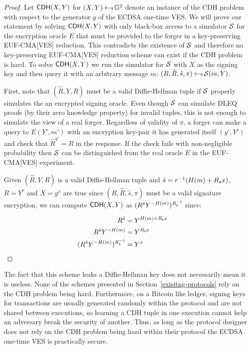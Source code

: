 \documentclass[fullpage]{article}
\theoremstyle{definition}
\newcommand{\EUFCMAVES}{\textsf{EUF-CMA}[\textsf{VES}]\xspace}
\newcommand{\G}{\mathbb{G}}
\begin{document}
\begin{proof}

  Let $\textsf{CDH}(X,Y)$ for $(X,Y) \sample \G^2$ denote an instance of the CDH problem with respect to the generator $g$ of the ECDSA one-time VES\@. We will prove our statement by solving $\textsf{CDH}(X,Y)$ with only black-box access to a simulator $\mathcal{S}$ for the encryption oracle $E$ that must be provided to the forger in a key-preserving \EUFCMAVES reduction. This contradicts the existence of $\mathcal{S}$ and therefore no key-preserving \EUFCMAVES reduction scheme can exist if the CDH problem is hard. To solve $\textsf{CDH}(X,Y)$ we run the simulator for $\mathcal{S}$ with $X$ as the signing key and then query it with an arbitrary message $m$: $(R, \hat{R}, \hat{s}, \pi) \hskip2.3pt{\gets\!\!\mbox{\tiny${\$}$\normalsize}}\, \mathcal{S}(m,Y)$.

   First, note that $(\hat{R},Y,R)$ must be a valid Diffie-Hellman tuple if $\mathcal{S}$ properly simulates the an encrypted signing oracle. Even though $\mathcal{S}$ can simulate DLEQ proofs (by their zero knowledge property) for invalid tuples, this is not enough to simulate the view of a real forger. Regardless of validity of $\pi$, a forger can make a query to $E(Y',m')$ with an encryption key-pair it has generated itself $(y',Y')$ and check that $\hat{R}^{y'} = R$ in the response. If the check fails with non-negligible probability then $\mathcal{S}$ can be distinguished from the real oracle $E$ in the \EUFCMAVES experiment.

   Given $(\hat{R},Y,R)$ is a valid Diffie-Hellman tuple and $\hat{s} = r^{-1}(H(m) + R_\texttt{x}{}x)$,  $R = Y^r$ and $X = g^x$ are true since $(R, \hat{R}, \hat{s}, \pi)$ must be a valid signature encryption, we can compute $\textsf{CDH}(X,Y)$ as $(R^{\hat{s}}Y^{-H(m)})^{R_\texttt{x}^{-1}}$ since:

\begin{align*}
    R^{\hat{s}} & = Y^{H(m) + R_\texttt{x}{}x} &  \\
    R^{\hat{s}}Y^{-H(m)} & =  Y^{R_\texttt{x}{}x} \\
    (R^{\hat{s}}Y^{-H(m)})^{R_\texttt{x}^{-1}} & = Y^{x}
\end{align*}
\end{proof}

The fact that this scheme leaks a Diffie-Hellman key does not necessarily mean it is useless. None of the schemes presented in Section~\ref{exisitng-protocols} rely on the CDH problem being hard. Furthermore, on a Bitcoin like ledger, signing keys for transactions are usually generated randomly within the protocol and are not shared between executions, so learning a CDH tuple in one execution cannot help an adversary break the security of another. Thus, as long as the protocol designer does not rely on the CDH problem being hard within their protocol the ECDSA one-time VES is practically secure.
\end{document}
